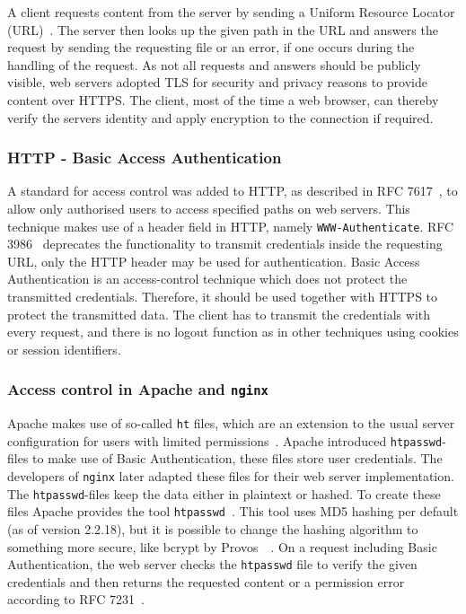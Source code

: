 A client requests content from the server by sending a Uniform Resource Locator
(URL)~\cite{rfc3986}. The server then looks up the given path in the URL and
answers the request by sending the requesting file or an error, if one occurs
during the handling of the request. As not all requests and answers should be
publicly visible, web servers adopted TLS for security and privacy reasons to
provide content over HTTPS. The client, most of the time a web browser, can
thereby verify the server\textquotesingle s identity and apply encryption to the
connection if required.

\subsubsection{HTTP - Basic Access Authentication}

A standard for access control was added to HTTP, as described in RFC
7617~\cite{rfc7617}, to allow only authorised users to access specified paths on
web servers. This technique makes use of a header field in HTTP, namely
\texttt{WWW-Authenticate}. RFC 3986~\cite{rfc3986} deprecates the functionality
to transmit credentials inside the requesting URL, only the HTTP header may be
used for authentication. Basic Access Authentication is an access-control
technique which does not protect the transmitted credentials. Therefore, it
should be used together with HTTPS to protect the transmitted data. The client
has to transmit the credentials with every request, and there is no logout
function as in other techniques using cookies or session identifiers.

\subsubsection{Access control in Apache and \texttt{nginx}}

Apache makes use of so-called \texttt{ht} files, which are an extension to the
usual server configuration for users with limited
permissions~\cite{apacheauthdoc}. Apache introduced \texttt{htpasswd}-files to
make use of Basic Authentication, these files store user credentials. The
developers of \texttt{nginx} later adapted these files for their web server
implementation. The \texttt{htpasswd}-files keep the data either in plaintext or
hashed. To create these files Apache provides the tool
\texttt{htpasswd}~\cite{htpasswddoc}. This tool uses MD5 hashing per default (as
of version 2.2.18), but it is possible to change the hashing algorithm to
something more secure, like bcrypt by Provos~\etal~\cite{bcrypt}. On a request
including Basic Authentication, the web server checks the \texttt{htpasswd} file
to verify the given credentials and then returns the requested content or a
permission error according to RFC 7231~\cite{rfc7231}.

